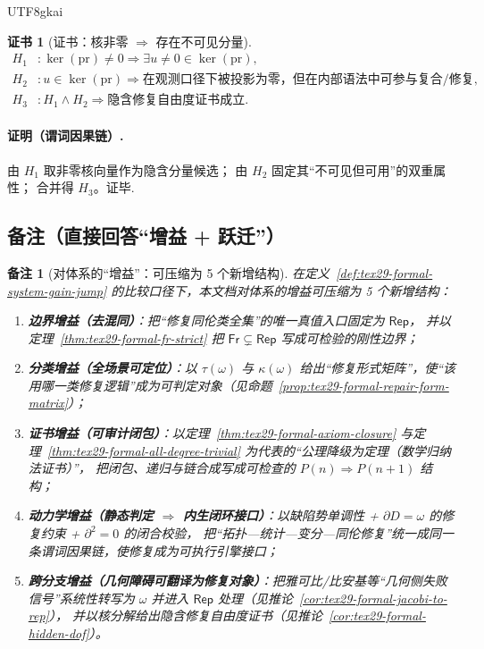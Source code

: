\documentclass[12pt]{article}
\newtheorem{remark}{备注}[section]
\newtheorem{Certificate}{证书}[section]
\begin{document}
\begin{CJK*}{UTF8}{gkai}
\begin{Certificate}[证书：核非零 $\Rightarrow$ 存在不可见分量]
\[
\begin{aligned}
  H_1 &: \ker(\mathrm{pr})\neq 0\Rightarrow \exists u\neq 0\in\ker(\mathrm{pr}),\\
  H_2 &: u\in\ker(\mathrm{pr})\Rightarrow \text{在观测口径下被投影为零，但在内部语法中可参与复合/修复},\\
  H_3 &: H_1\wedge H_2\Rightarrow \text{隐含修复自由度证书成立}.
\end{aligned}
\]
\end{Certificate}

\paragraph{证明（谓词因果链）.}
由 $H_1$ 取非零核向量作为隐含分量候选；
由 $H_2$ 固定其“不可见但可用”的双重属性；
合并得 $H_3$。证毕.

\subsection{备注（直接回答“增益 + 跃迁”）}
\label{subsec:tex29-formal-remarks-gain-jump}

\begin{remark}[对体系的“增益”：可压缩为 5 个新增结构]
在定义~\ref{def:tex29-formal-system-gain-jump} 的比较口径下，本文档对体系的增益可压缩为 5 个新增结构：
\begin{enumerate}
  \item \textbf{边界增益（去混同）}：把“修复同伦类全集”的唯一真值入口固定为 $\mathsf{Rep}$，
  并以定理~\ref{thm:tex29-formal-fr-strict} 把 $\mathsf{Fr}\subsetneq\mathsf{Rep}$ 写成可检验的刚性边界；
  \item \textbf{分类增益（全场景可定位）}：以 $\tau(\omega)$ 与 $\kappa(\omega)$ 给出“修复形式矩阵”，使“该用哪一类修复逻辑”成为可判定对象（见命题~\ref{prop:tex29-formal-repair-form-matrix}）；
  \item \textbf{证书增益（可审计闭包）}：以定理~\ref{thm:tex29-formal-axiom-closure} 与定理~\ref{thm:tex29-formal-all-degree-trivial}
    为代表的“公理降级为定理（数学归纳法证书）”，
  把闭包、递归与链合成写成可检查的 $P(n)\Rightarrow P(n+1)$ 结构；
  \item \textbf{动力学增益（静态判定 $\Rightarrow$ 内生闭环接口）}：以缺陷势单调性 + $\partial D=\omega$ 的修复约束 + $\partial^2=0$ 的闭合校验，
  把“拓扑—统计—变分—同伦修复”统一成同一条谓词因果链，使修复成为可执行引擎接口；
  \item \textbf{跨分支增益（几何障碍可翻译为修复对象）}：把雅可比/比安基等“几何侧失败信号”系统性转写为 $\omega$ 并进入 $\mathsf{Rep}$ 处理（见推论~\ref{cor:tex29-formal-jacobi-to-rep}），
  并以核分解给出隐含修复自由度证书（见推论~\ref{cor:tex29-formal-hidden-dof}）。
\end{enumerate}
\end{remark}


\end{CJK*}
\end{document}
